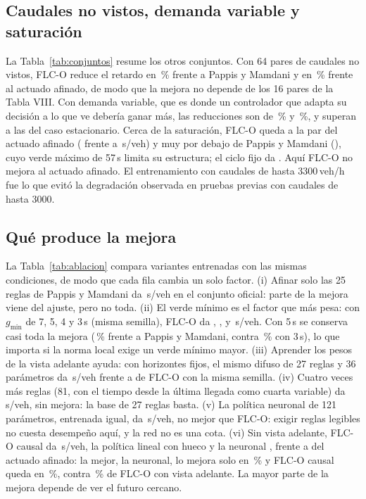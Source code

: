 \documentclass[journal]{IEEEtran}
\newcommand{\FLC}{FLC-O}
\begin{document}
\subsection{Caudales no vistos, demanda variable y saturación}
\label{sec:res-otros}
La Tabla~\ref{tab:conjuntos} resume los otros conjuntos. Con 64 pares de caudales no vistos, \FLC{} reduce el retardo en \RedPapNv\,\% frente a Pappis y Mamdani y en \RedActAfNv\,\% frente al actuado afinado, de modo que la mejora no depende de los 16 pares de la Tabla VIII. Con demanda variable, que es donde un controlador que adapta su decisión a lo que ve debería ganar más, las reducciones son de \RedPapVa\,\% y \RedActAfVa\,\%, y superan a las del caso estacionario. Cerca de la saturación, \FLC{} queda a la par del actuado afinado (\DelaySaFlc{} frente a \DelaySaActAf{}\,s/veh) y muy por debajo de Pappis y Mamdani (\DelaySaPap{}), cuyo verde máximo de 57\,s limita su estructura; el ciclo fijo da \DelaySaFijo{}. Aquí \FLC{} no mejora al actuado afinado. El entrenamiento con caudales de hasta 3300\,veh/h fue lo que evitó la degradación observada en pruebas previas con caudales de hasta 3000.



\subsection{Qué produce la mejora}
\label{sec:res-abl}
La Tabla~\ref{tab:ablacion} compara variantes entrenadas con las mismas condiciones, de modo que cada fila cambia un solo factor.
(i) Afinar solo las 25 reglas de Pappis y Mamdani da \DelayOfPapAf{}\,s/veh en el conjunto oficial: parte de la mejora viene del ajuste, pero no toda.
(ii) El verde mínimo es el factor que más pesa: con $g_{\min}$ de 7, 5, 4 y 3\,s (misma semilla), \FLC{} da \DelayOfGSiete{}, \DelayOfGCinco{}, \DelayOfGCuatro{} y \DelayOfSemCero{}\,s/veh. Con 5\,s se conserva casi toda la mejora (\RedPapGCinco\,\% frente a Pappis y Mamdani, contra \RedPapSemCero\,\% con 3\,s), lo que importa si la norma local exige un verde mínimo mayor.
(iii) Aprender los pesos de la vista adelante ayuda: con horizontes fijos, el mismo difuso de 27 reglas y 36 parámetros da \DelayOfFijos{}\,s/veh frente a \DelayOfSemCero{} de \FLC{} con la misma semilla.
(iv) Cuatro veces más reglas (81, con el tiempo desde la última llegada como cuarta variable) da \DelayOfReglas{}\,s/veh, sin mejora: la base de 27 reglas basta.
(v) La política neuronal de 121 parámetros, entrenada igual, da \DelayOfMlp{}\,s/veh, no mejor que \FLC{}: exigir reglas legibles no cuesta desempeño aquí, y la red no es una cota.
(vi) Sin vista adelante, \FLC{} causal da \DelayOfFlcC{}\,s/veh, la política lineal con hueco \DelayOfLinC{} y la neuronal \DelayOfMlpC{}, frente a \DelayOfActAf{} del actuado afinado: la mejor, la neuronal, lo mejora solo en \RedActMlpC\,\% y \FLC{} causal queda en \RedActFlcC\,\%, contra \RedActAfOf\,\% de \FLC{} con vista adelante. La mayor parte de la mejora depende de ver el futuro cercano.
\end{document}
